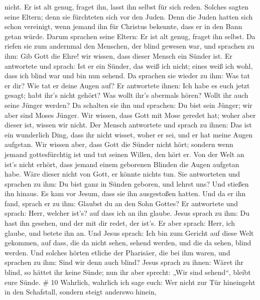 nicht. Er ist alt genug, fraget ihn, lasst ihn selbst für sich reden.
 Solches sagten seine Eltern; denn sie fürchteten sich vor
den Juden. Denn die Juden hatten sich schon vereinigt, wenn jemand ihn
für Christus bekennte, dass er in den Bann getan würde. 
Darum sprachen seine Eltern: Er ist alt genug, fraget ihn selbst.
 Da riefen sie zum andernmal den Menschen, der blind
gewesen war, und sprachen zu ihm: Gib Gott die Ehre! wir wissen, dass
dieser Mensch ein Sünder ist.  Er antwortete und sprach:
Ist er ein Sünder, das weiß ich nicht; eines weiß ich wohl, dass ich
blind war und bin nun sehend.  Da sprachen sie wieder zu
ihm: Was tat er dir? Wie tat er deine Augen auf?  Er
antwortete ihnen: Ich habe es euch jetzt gesagt; habt ihr's nicht
gehört? Was wollt ihr's abermals hören? Wollt ihr auch seine Jünger
werden?  Da schalten sie ihn und sprachen: Du bist sein
Jünger; wir aber sind Moses Jünger.  Wir wissen, dass Gott
mit Mose geredet hat; woher aber dieser ist, wissen wir nicht.
 Der Mensch antwortete und sprach zu ihnen: Das ist ein
wunderlich Ding, dass ihr nicht wisset, woher er sei, und er hat meine
Augen aufgetan.  Wir wissen aber, dass Gott die Sünder
nicht hört; sondern wenn jemand gottesfürchtig ist und tut seinen
Willen, den hört er.  Von der Welt an ist's nicht erhört,
dass jemand einem geborenen Blinden die Augen aufgetan habe.
 Wäre dieser nicht von Gott, er könnte nichts tun.
 Sie antworteten und sprachen zu ihm: Du bist ganz in
Sünden geboren, und lehrst uns? Und stießen ihn hinaus.  Es
kam vor Jesum, dass sie ihn ausgestoßen hatten. Und da er ihn fand,
sprach er zu ihm: Glaubst du an den Sohn Gottes?  Er
antwortete und sprach: Herr, welcher ist's? auf dass ich an ihn glaube.
 Jesus sprach zu ihm: Du hast ihn gesehen, und der mit dir
redet, der ist's.  Er aber sprach: Herr, ich glaube, und
betete ihn an.  Und Jesus sprach: Ich bin zum Gericht auf
diese Welt gekommen, auf dass, die da nicht sehen, sehend werden, und
die da sehen, blind werden.  Und solches hörten etliche der
Pharisäer, die bei ihm waren, und sprachen zu ihm: Sind wir denn auch
blind?  Jesus sprach zu ihnen: Wäret ihr blind, so hättet
ihr keine Sünde; nun ihr aber sprecht: „Wir sind sehend``, bleibt eure
Sünde. \# 10  Wahrlich, wahrlich ich sage euch: Wer nicht
zur Tür hineingeht in den Schafstall, sondern steigt anderswo hinein,
